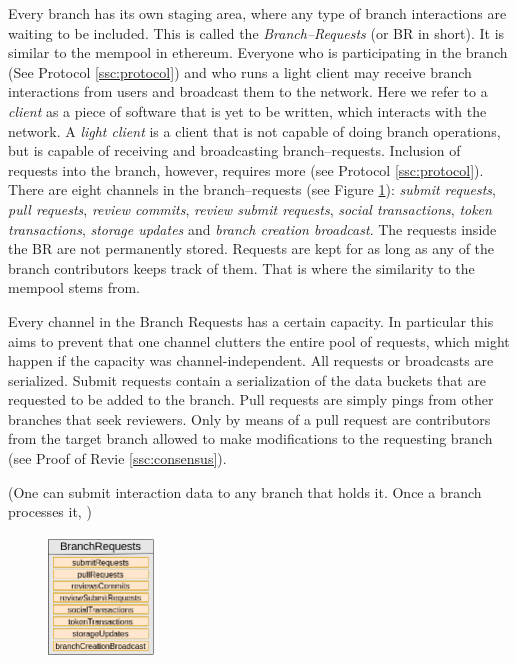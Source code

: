 \documentclass[14pt]{article}
\newcommand{\remark}[1]{{\color{purple} (#1)}}
\begin{document}
Every branch has its own staging area, where any type of branch interactions are waiting to be included. This is called the \textit{Branch--Requests} (or BR in short). It is similar to the mempool in ethereum. Everyone who is participating in the branch (See Protocol \ref{ssc:protocol}) and who runs a light client may receive branch interactions from users and broadcast them to the network. Here we refer to a \textit{client} as a piece of software that is yet to be written, which interacts with the network. A \textit{light client} is a client that is not capable of doing branch operations, but is capable of receiving and broadcasting branch--requests. Inclusion of requests into the branch, however, requires more (see Protocol \ref{ssc:protocol}). There are eight channels in the branch--requests (see Figure \ref{fig:mempool}): \textit{submit requests}, \textit{pull requests}, \textit{review commits}, \textit{review submit requests}, \textit{social transactions}, \textit{token transactions}, \textit{storage updates} and \textit{branch creation broadcast}. The requests inside the BR are not permanently stored. Requests are kept for as long as any of the branch contributors keeps track of them. That is where the similarity to the mempool stems from.

Every channel in the Branch Requests has a certain capacity. In particular this aims to prevent that one channel clutters the entire pool of requests, which might happen if the capacity was channel-independent. All requests or broadcasts are serialized. 
Submit requests contain a serialization of the data buckets that are requested to be added to the branch. Pull requests are simply pings from other branches that seek reviewers. Only by means of a pull request are contributors from the target branch allowed to make modifications to the requesting branch (see Proof of Revie \ref{ssc:consensus}).


\remark{One can submit interaction data to any branch that holds it. Once a branch processes it, }



\begin{figure}[h!]
  \begin{center}
    \includegraphics[width=0.25\textwidth]{img/MempoolV3.png}
\end{center}
 \caption{}
 \label{fig:mempool}
\end{figure}
\end{document}
